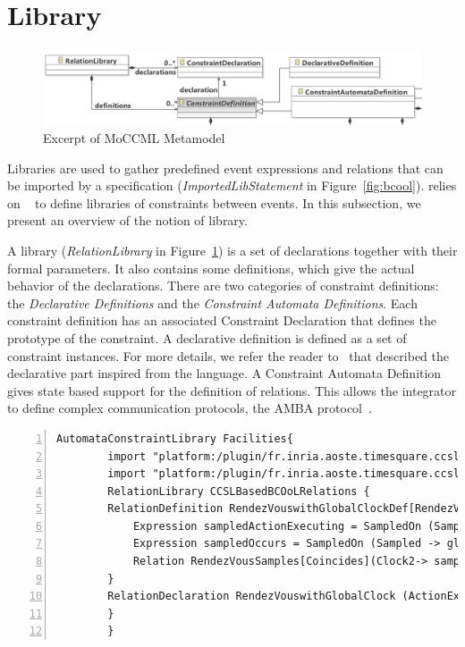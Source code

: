 \section{Library}
\label{subsec:bcoollib}

\begin{figure}
	\center
	\includegraphics[width=.8\textwidth]{bcool/figs/moccmlmm}
	\caption{Excerpt of MoCCML Metamodel}
	\label{fig:moccml}
\end{figure}

Libraries are used to gather predefined event expressions and relations that can be imported by a \bcool specification (\emph{ImportedLibStatement} in Figure~\ref{fig:bcool}). \bcool relies on \moccml~\cite{moccmlbib} to define libraries of constraints between events. In this subsection, we present an overview of the notion of \moccml library.

A \moccml library (\emph{RelationLibrary} in Figure~\ref{fig:moccml}) is a set of declarations together with their formal parameters. It also contains some definitions, which give the actual behavior of the declarations. There are two categories of constraint definitions: the \emph{Declarative Definitions} and the \emph{Constraint Automata Definitions}. Each constraint definition has an associated Constraint Declaration that defines the prototype of the constraint. A declarative definition is defined as a set of constraint instances. For more details, we refer the reader to~\cite{moccmloperbib} that described the declarative part inspired from the \ccsl language. A Constraint Automata Definition gives state based support for the definition of relations. This allows the integrator to define complex communication protocols, \eg the AMBA protocol~\cite{ambabus}.

\begin{lstlisting}[language=moccml,
		caption={Facilities Library in \moccml},
		label={lst:moccmllib}, 
		basicstyle=\scriptsize\ttfamily, backgroundcolor=\color{LGrey}, numbers=left, xleftmargin=2pt]
		AutomataConstraintLibrary Facilities{ 
		import "platform:/plugin/fr.inria.aoste.timesquare.ccslkernel.model/ccsllibrary/kernel.ccslLib" as kernel;
		import "platform:/plugin/fr.inria.aoste.timesquare.ccslkernel.model/ccsllibrary/CCSL.ccslLib" as CCSLLib;
		RelationLibrary CCSLBasedBCOoLRelations {
		RelationDefinition RendezVouswithGlobalClockDef[RendezVouswithGlobalClock]{ 
			Expression sampledActionExecuting = SampledOn (Sampled -> globalClock, Trigger-> ActionExecuting)
			Expression sampledOccurs = SampledOn (Sampled -> globalClock, Trigger-> FSMEventTriggering)
			Relation RendezVousSamples[Coincides](Clock2-> sampledActionExecuting , Clock1->FSMEventTriggering)
		}
		RelationDeclaration RendezVouswithGlobalClock (ActionExecuting: clock , FSMEventTriggering: clock, globalClock: clock)
		}
		}
\end{lstlisting}

